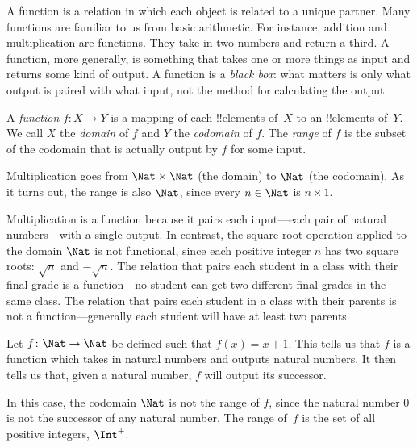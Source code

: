\documentclass[../../include/open-logic-section]{subfiles}
\begin{document}

\begin{explain}
A function is a relation in which each object is related to a unique partner. Many functions are familiar to us from basic arithmetic. For instance, addition and multiplication are functions. They take in two numbers and return a third. A function, more generally, is something that takes one or more things as input and returns some kind of output. A function is a \emph{black box}: what matters is only what output is paired with what input, not the method for calculating the output. 
\end{explain}

\begin{defn}
A \emph{function} $f \colon X \to Y$ is a mapping of each !!{element}s
of~$X$ to an !!{element}s of~$Y$. We call $X$ the \emph{domain} of $f$
and $Y$ the \emph{codomain} of $f$. The \emph{range} of $f$ is the
subset of the codomain that is actually output by $f$ for some input.
\end{defn}

\begin{ex}
Multiplication goes from $\Nat \times \Nat$ (the domain) to $\Nat$ (the codomain). As it turns out, the range is also $\Nat$, since every $n \in \Nat$ is $n \times 1$.
\end{ex}

\begin{explain}
Multiplication is a function because it pairs each input---each pair of natural numbers---with a single output. In contrast, the square root operation applied to the domain $\Nat$ is not functional, since each positive integer $n$ has two square roots: $\sqrt{n}$ and $-\sqrt{n}$. The relation that pairs each student in a class with their final grade is a function---no student can get two different final grades in the same class. The relation that pairs each student in a class with their parents is not a function---generally each student will have at least two parents.
\end{explain}

\begin{ex}
Let $f \colon \Nat \to \Nat$ be defined such that $f(x) = x+1$. This tells us that $f$ is a function which takes in natural numbers and outputs natural numbers. It then tells us that, given a natural number, $f$ will output its successor.
\end{ex}

\begin{explain}
In this case, the codomain $\Nat$ is not the range of $f$, since the natural number $0$ is not the successor of any natural number. The range of~$f$ is the set of all positive integers, $\Int^{+}$.
\end{explain}
\end{document}
